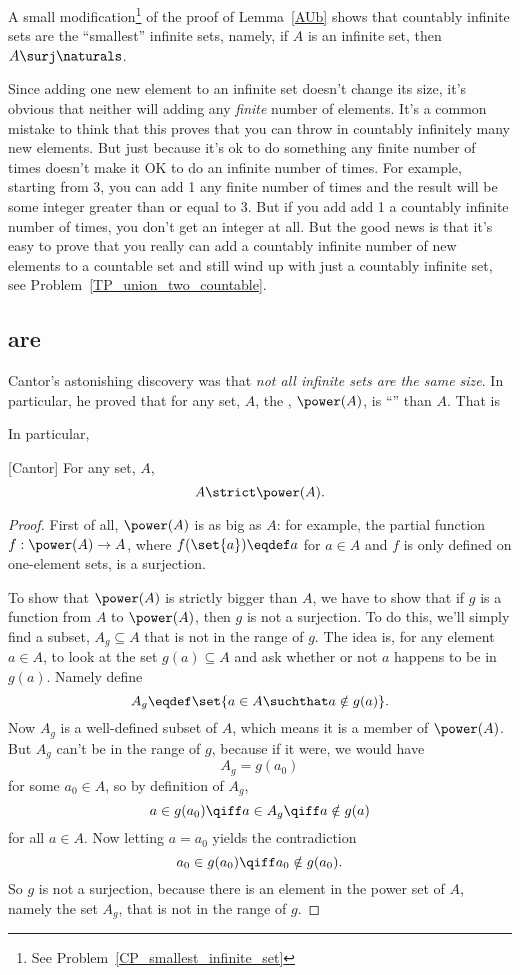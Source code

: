 A small modification\footnote{See
  Problem~\ref{CP_smallest_infinite_set}} of the proof of
Lemma~\ref{AUb} shows that countably infinite sets are the
``smallest'' infinite sets, namely, if $A$ is an infinite set, then $A
\surj \naturals$.

Since adding one new element to an infinite set doesn't change its size,
it's obvious that neither will adding any \emph{finite} number of
elements.  It's a common mistake to think that this proves that you can
throw in countably infinitely many new elements.  But just because it's ok
to do something any finite number of times doesn't make it OK to do an
infinite number of times.  For example, starting from 3, you can add 1 any
finite number of times and the result will be some integer greater than or
equal to 3.  But if you add add 1 a countably infinite number of times,
you don't get an integer at all.  But the good news is that it's easy to
prove that you really can add a countably infinite number of new elements
to a countable set and still wind up with just a countably infinite set,
see Problem~\ref{TP_union_two_countable}.

\subsection{ are }

Cantor's astonishing discovery was that \emph{not all infinite sets
  are the same size}.  In particular, he proved that for any set, $A$,
the , $\power(A)$, is ``'' than
$A$.  That is

In particular,
\begin{theorem}\label{powbig}[Cantor]\mbox{}
For any set, $A$,
\[
A \strict \power(A).
\]
\end{theorem}
\begin{proof}
  First of all, $\power(A)$ is as big as $A$: for example, the partial
  function $f:\power(A) \to A$, where $f(\set{a}) \eqdef a$ for $a \in A$
  and $f$ is only defined on one-element sets, is a surjection.

  To show that $\power(A)$ is strictly bigger than $A$, we have to show
  that if $g$ is a function from $A$ to $\power(A)$, then $g$ is not a
  surjection.  To do this, we'll simply find a subset, $A_g \subseteq A$
  that is not in the range of $g$.  The idea is, for any element $a \in
  A$, to look at the set $g(a) \subseteq A$ and ask whether or not $a$
  happens to be in $g(a)$.  Namely define \iffalse mimicking Russell's
  Paradox,\fi
  \[
  A_g \eqdef \set{a \in A \suchthat a \notin g(a)}.
  \]
  Now $A_g$ is a well-defined subset of $A$, which means it is a member of
  $\power(A)$.  But $A_g$ can't be in the range of $g$, because if it
  were, we would have
\[
A_g = g(a_0)
\]
for some $a_0 \in A$, so by definition of $A_g$,
\[
a \in g(a_0) \qiff a \in A_g \qiff a \notin g(a)
\]
for all $a \in A$.  Now letting $a = a_0$ yields the contradiction
\[
a_0 \in g(a_0) \qiff a_0 \notin g(a_0).
\]
So $g$ is not a surjection, because there is an element in the power set
of $A$, namely the set $A_g$, that is not in the range of $g$.
\end{proof}

